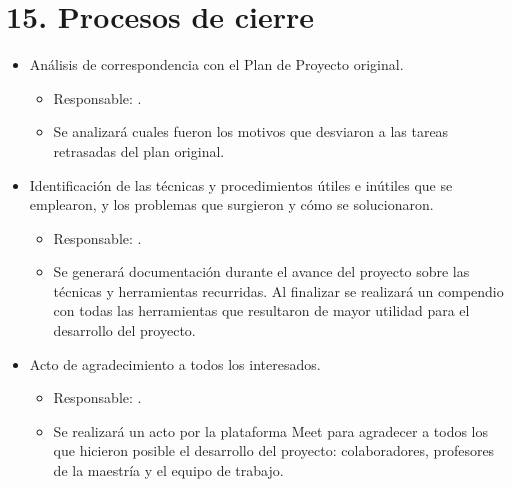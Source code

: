 \documentclass[
11pt, %
codirector, %
]{charter}
\begin{document}
\section{15. Procesos de cierre}
\label{sec:cierre}

\begin{itemize}
	\item Análisis de correspondencia con el Plan de Proyecto original.
	      \begin{itemize}
		      \item Responsable: \authorname\hspace{1px}.
		      \item Se analizará cuales fueron los motivos que desviaron a las tareas retrasadas del plan original.
	      \end{itemize}
	\item Identificación de las técnicas y procedimientos útiles e inútiles que se emplearon, y los problemas que surgieron y cómo se solucionaron.
	      \begin{itemize}
		      \item Responsable: \authorname\hspace{1px}.
		      \item Se generará documentación durante el avance del proyecto sobre las técnicas y herramientas recurridas. Al finalizar se realizará un compendio con todas las herramientas que resultaron de mayor utilidad para el desarrollo del proyecto.
	      \end{itemize}
	\item Acto de agradecimiento a todos los interesados.
	      \begin{itemize}
		      \item Responsable: \authorname\hspace{1px}.
		      \item Se realizará un acto por la plataforma Meet para agradecer a todos los que hicieron posible el desarrollo del proyecto: colaboradores, profesores de la maestría y el equipo de trabajo.
	      \end{itemize}
\end{itemize}
\end{document}
